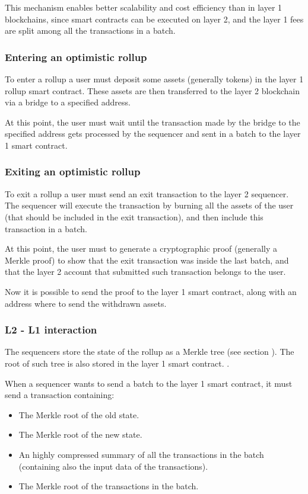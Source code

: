 \documentclass[12pt]{article}
\begin{document}
This mechanism enables better scalability and cost efficiency than in layer 1 blockchains, since smart contracts can be executed on layer 2, and the layer 1 fees are split among all the transactions in a batch.

\subsubsection{Entering an optimistic rollup} \label{subsubsection:entering_optimistic_rollup}
To enter a rollup a user must deposit some assets (generally tokens) in the layer 1 rollup smart contract. These assets are then transferred to the layer 2 blockchain via a bridge to a specified address.

At this point, the user must wait until the transaction made by the bridge to the specified address gets processed by the sequencer and sent in a batch to the layer 1 smart contract.

\subsubsection{Exiting an optimistic rollup} \label{subsubsection:exiting_optimistic_rollup}
To exit a rollup a user must send an exit transaction to the layer 2 sequencer. The sequencer will execute the transaction by burning all the assets of the user (that should be included in the exit transaction), and then include this transaction in a batch.

At this point, the user must to generate a cryptographic proof (generally a Merkle proof) to show that the exit transaction was inside the last batch, and that the layer 2 account that submitted such transaction belongs to the user.

Now it is possible to send the proof to the layer 1 smart contract, along with an address where to send the withdrawn assets.

\subsubsection{L2 - L1 interaction} \label{subsubsection:l2l1i}
The sequencers store the state of the rollup as a Merkle tree (see section ). The root of such tree is also stored in the layer 1 smart contract. \cite{optimistic_rollups}.

When a sequencer wants to send a batch to the layer 1 smart contract, it must send a transaction containing:
\begin{itemize}
    \item The Merkle root of the old state.
    \item The Merkle root of the new state.
    \item An highly compressed summary of all the transactions in the batch (containing also the input data of the transactions).
    \item The Merkle root of the transactions in the batch.
\end{itemize}
\end{document}
